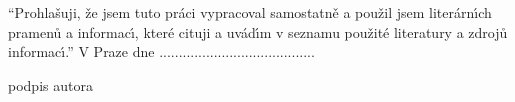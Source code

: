 \documentclass[../TakeYourPill.tex]{subfiles}
\begin{document}
\vspace*{\fill}
\enquote{Prohlašuji, že jsem tuto práci vypracoval samostatně a použil jsem literárnı́ch pramenů a informacı́, které cituji a uvádı́m v seznamu použité literatury a zdrojů informacı́.}\hfill \break
V Praze dne
{
  ....................\hfill....................
}
\begin{flushright}
    podpis autora
\end{flushright}
\end{document}
